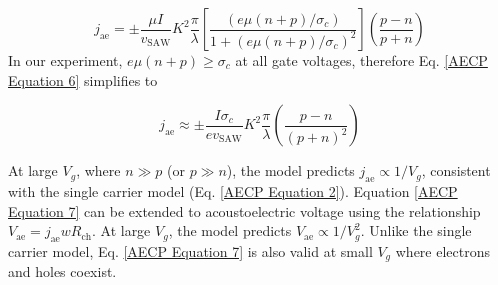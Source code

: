 \documentclass[double,12pt,1in,seploa]{beavtex}
\begin{document}
\begin{equation}
    j_{\mathrm{ae}} = \pm \frac{\mu I}{v_{\mathrm{SAW}}}K^2\frac{\pi}{\lambda}\left[\frac{(e\mu(n+p)/\sigma_c)}{1+ (e\mu(n+p)/\sigma_c)^2}\right]\left(\frac{p-n}{p+n}\right)
    \label{AECP Equation 6}
\end{equation}
In our experiment, $e\mu(n + p) \geq \sigma_c$ at all gate voltages, therefore Eq. \ref{AECP Equation 6} simplifies to 

\begin{equation}
    j_{\mathrm{ae}} \approx \pm \frac{I \sigma_c}{e v_{\mathrm{SAW}}}K^2\frac{\pi}{\lambda}\left(\frac{p-n}{(p+n)^2}\right)
    \label{AECP Equation 7}
\end{equation}

At large $V_g$, where $n \gg p$ (or $p \gg n$), the model predicts $j_{\mathrm{ae}} \propto 1/V_g$, consistent with the single carrier model (Eq. \ref{AECP Equation 2}). Equation \ref{AECP Equation 7} can be extended to acoustoelectric voltage using the relationship $V_{\mathrm{ae}} = j_{\mathrm{ae}} w R_{\mathrm{ch}}$. At large $V_g$, the model predicts $V_{\mathrm{ae}} \propto 1/V_g^2$. Unlike the single carrier model, Eq. \ref{AECP Equation 7} is also valid at small $V_g$ where electrons and holes coexist. 
\end{document}
